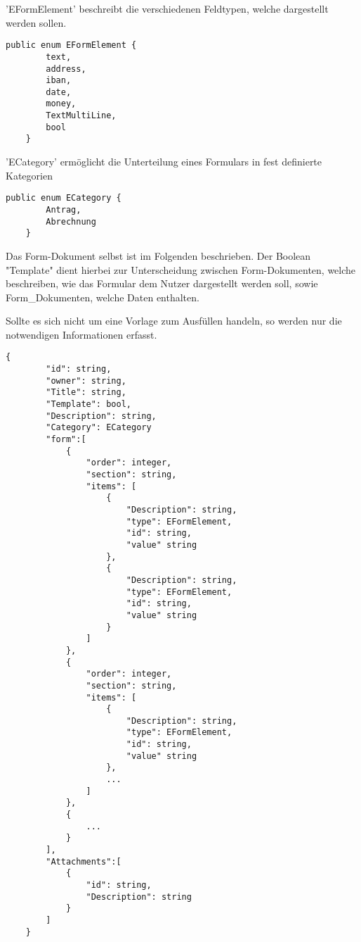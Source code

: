 'EFormElement' beschreibt die verschiedenen Feldtypen, welche dargestellt werden sollen.
\begin{lstlisting}[label={lst:EFormElement}]
    public enum EFormElement {
        text,
        address,
        iban,
        date,
        money,
        TextMultiLine,
        bool
    }
\end{lstlisting}


'ECategory' ermöglicht die Unterteilung eines Formulars in fest definierte Kategorien
\begin{lstlisting}[label={lst:ECategory}]
    public enum ECategory {
        Antrag,
        Abrechnung
    }
\end{lstlisting}

Das Form-Dokument selbst ist im Folgenden beschrieben.
Der Boolean "Template" dient hierbei zur Unterscheidung zwischen
Form-Dokumenten, welche beschreiben, wie das Formular dem Nutzer
dargestellt werden soll, sowie Form_Dokumenten, welche Daten enthalten.

Sollte es sich nicht um eine Vorlage zum Ausfüllen handeln, so werden nur die notwendigen Informationen erfasst.
\begin{lstlisting}[label={lst:lstlistingdoc}]
    {
        "id": string,
        "owner": string,
        "Title": string,
        "Template": bool,
        "Description": string,
        "Category": ECategory
        "form":[
            {
                "order": integer,
                "section": string,
                "items": [
                    {
                        "Description": string,
                        "type": EFormElement,
                        "id": string,
                        "value" string
                    },
                    {
                        "Description": string,
                        "type": EFormElement,
                        "id": string,
                        "value" string
                    }
                ]
            },
            {
                "order": integer,
                "section": string,
                "items": [
                    {
                        "Description": string,
                        "type": EFormElement,
                        "id": string,
                        "value" string
                    },
                    ...
                ]
            },
            {
                ...
            }
        ],
        "Attachments":[
            {
                "id": string,
                "Description": string
            }
        ]
    }
\end{lstlisting}